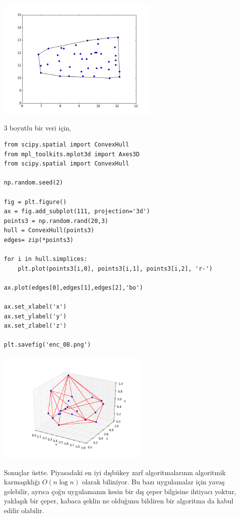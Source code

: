\documentclass[12pt,fleqn]{article}\usepackage{../../common}
\begin{document}
\includegraphics[height=6cm]{enc_01.png}

3 boyutlu bir veri için,

\begin{verbatim}
from scipy.spatial import ConvexHull
from mpl_toolkits.mplot3d import Axes3D
from scipy.spatial import ConvexHull

np.random.seed(2)

fig = plt.figure()
ax = fig.add_subplot(111, projection='3d')
points3 = np.random.rand(20,3)
hull = ConvexHull(points3)
edges= zip(*points3)

for i in hull.simplices:
    plt.plot(points3[i,0], points3[i,1], points3[i,2], 'r-')

ax.plot(edges[0],edges[1],edges[2],'bo')

ax.set_xlabel('x')
ax.set_ylabel('y')
ax.set_zlabel('z')

plt.savefig('enc_08.png')
\end{verbatim}

\includegraphics[width=20em]{enc_08.png}

Sonuçlar üstte. Piyasadaki en iyi dışbükey zarf algoritmalarının algoritmik
karmaşıklığı $O(n \log n)$ olarak biliniyor. Bu bazı uygulamalar için yavaş
gelebilir, ayrıca çoğu uygulamanın kesin bir dış çeper bilgisine
ihtiyacı yoktur, yaklaşık bir çeper, kabaca şeklin ne olduğunu bildiren bir
algoritma da kabul edilir olabilir.
\end{document}
